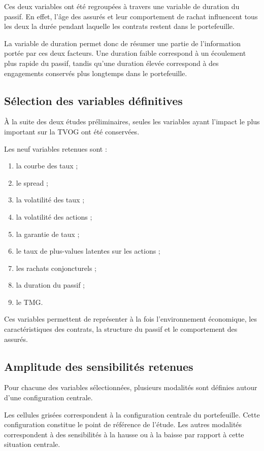 Ces deux variables ont été regroupées à travers une variable de duration du passif. En effet, l'âge des assurés et leur comportement de rachat influencent tous les deux la durée pendant laquelle les contrats restent dans le portefeuille.

La variable de duration permet donc de résumer une partie de l'information portée par ces deux facteurs. Une duration faible correspond à un écoulement plus rapide du passif, tandis qu'une duration élevée correspond à des engagements conservés plus longtemps dans le portefeuille.


\subsection{Sélection des variables définitives}

À la suite des deux études préliminaires, seules les variables ayant l'impact le plus important sur la TVOG ont été conservées.

Les neuf variables retenues sont :

\begin{enumerate}
    \renewcommand{\labelitemi}{\textbullet}
    \item la courbe des taux ;
    \item le spread ;
    \item la volatilité des taux ;
    \item la volatilité des actions ;
    \item la garantie de taux ;
    \item le taux de plus-values latentes sur les actions ;
    \item les rachats conjoncturels ;
    \item la duration du passif ;
    \item le TMG.
\end{enumerate}

Ces variables permettent de représenter à la fois l'environnement économique, les caractéristiques des contrats, la structure du passif et le comportement des assurés.


\subsection{Amplitude des sensibilités retenues}

Pour chacune des variables sélectionnées, plusieurs modalités sont définies autour d'une configuration centrale. 

Les cellules grisées correspondent à la configuration centrale du portefeuille. Cette configuration constitue le point de référence de l'étude. Les autres modalités correspondent à des sensibilités à la hausse ou à la baisse par rapport à cette situation centrale.

